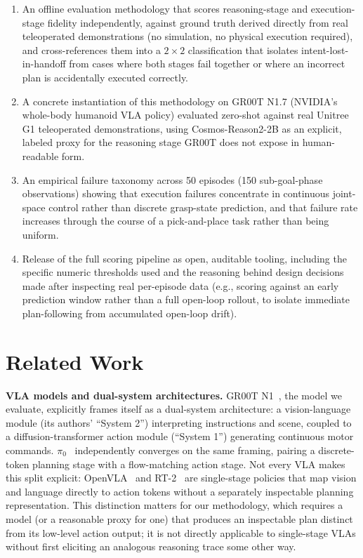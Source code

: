 \documentclass[conference]{IEEEtran}
\begin{document}
\begin{enumerate}
\item An offline evaluation methodology that scores reasoning-stage and execution-stage
  fidelity independently, against ground truth derived directly from real teleoperated
  demonstrations (no simulation, no physical execution required), and cross-references
  them into a $2\times2$ classification that isolates intent-lost-in-handoff from cases
  where both stages fail together or where an incorrect plan is accidentally executed
  correctly.
\item A concrete instantiation of this methodology on GR00T N1.7 (NVIDIA's whole-body
  humanoid VLA policy) evaluated zero-shot against real Unitree G1 teleoperated
  demonstrations, using Cosmos-Reason2-2B as an explicit, labeled proxy for the reasoning
  stage GR00T does not expose in human-readable form.
\item An empirical failure taxonomy across 50 episodes (150 sub-goal-phase observations)
  showing that execution failures concentrate in continuous joint-space control rather
  than discrete grasp-state prediction, and that failure rate increases through the
  course of a pick-and-place task rather than being uniform.
\item Release of the full scoring pipeline as open, auditable tooling, including the
  specific numeric thresholds used and the reasoning behind design decisions made after
  inspecting real per-episode data (e.g., scoring against an early prediction window
  rather than a full open-loop rollout, to isolate immediate plan-following from
  accumulated open-loop drift).
\end{enumerate}

\section{Related Work}

\textbf{VLA models and dual-system architectures.} GR00T N1~\cite{bjorck2025groot}, the
model we evaluate, explicitly frames itself as a dual-system architecture: a
vision-language module (its authors' ``System 2'') interpreting instructions and scene,
coupled to a diffusion-transformer action module (``System 1'') generating continuous
motor commands. $\pi_0$~\cite{black2024pi0} independently converges on the same framing,
pairing a discrete-token planning stage with a flow-matching action stage. Not every VLA
makes this split explicit: OpenVLA~\cite{kim2024openvla} and
RT-2~\cite{brohan2023rt2} are single-stage policies that map vision and language directly
to action tokens without a separately inspectable planning representation. This
distinction matters for our methodology, which requires a model (or a reasonable proxy
for one) that produces an inspectable plan distinct from its low-level action output; it
is not directly applicable to single-stage VLAs without first eliciting an analogous
reasoning trace some other way.
\end{document}

